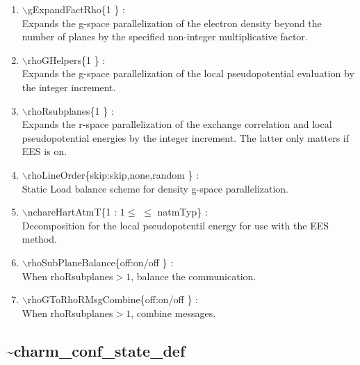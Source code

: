 \documentclass[12pt,titlepage]{article}
\begin{document}
\begin{enumerate}
  \vspace{0.15in} 
  \item $\backslash$gExpandFactRho\{1 \} : \\    
  Expands the g-space parallelization of the electron density beyond
  the number of planes by the specified non-integer multiplicative factor. 
  \vspace{0.15in} 
  \item $\backslash$rhoGHelpers\{1 \} : \\    
  Expands the g-space parallelization of the local pseudopotential
  evaluation by the integer increment.
  \vspace{0.15in} 
  \item $\backslash$rhoRsubplanes\{1 \} : \\    
  Expands the r-space parallelization of the exchange correlation and 
  local pseudopotential energies by the integer increment. 
  The latter only matters if EES is on.
  \vspace{0.15in} 
  \item $\backslash$rhoLineOrder\{skip:skip,none,random \} : \\    
  Static Load balance scheme for density g-space parallelization.
  \vspace{0.15in} 
  \item $\backslash$nchareHartAtmT\{1 : $1 \leq$ $\leq$ natmTyp\} : \\ 
  Decomposition for the local pseudopotentil energy for use with the 
  EES method.
  \vspace{0.15in} 
  \item $\backslash$rhoSubPlaneBalance\{off:on/off \} : \\    
  When rhoRsubplanes$>1$, balance the communication.
  \vspace{0.15in} 
  \item $\backslash$rhoGToRhoRMsgCombine\{off:on/off \} : \\    
  When rhoRsubplanes$>1$, combine messages.
\end{enumerate}

\newpage
\subsection*{\bf \~{ }charm\_conf\_state\_def}
\end{document}
